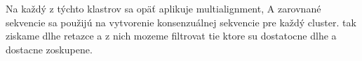 Na každý z týchto klastrov sa opäť aplikuje multialignment, A zarovnané sekvencie sa použijú na vytvorenie konsenzuálnej sekvencie pre každý cluster.
tak ziskame dlhe retazce a z nich mozeme filtrovat tie ktore su dostatocne dlhe a dostacne zoskupene.
